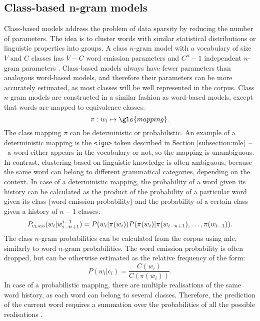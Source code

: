 	\subsection{Class-based n-gram models}
	\label{subsection:class}
	Class-based models address the problem of data sparsity by reducing the number of parameters. The idea is to cluster words with similar statistical distributions or linguistic properties into groups. A class \mbox{$n$-gram} model with a vocabulary of size $V$ and $C$ classes has $V-C$ word emission parameters and $C^{n}-1$ independent \mbox{$n$-gram} parameters \cite{brown1992class}. Class-based models always have fewer parameters than analogous word-based models, and therefore their parameters can be more accurately estimated, as most classes will be well represented in the corpus. Class \mbox{$n$-gram} models are constructed in a similar fashion as word-based models, except that words are mapped to equivalence classes: 
	\begin{equation}
		\pi:w_{i}\mapsto \gls{mapping}.
		\label{equation:deterministic_class}
	\end{equation}
	The class mapping $\pi$ can be deterministic or probabilistic. An example of a deterministic mapping is the \texttt{<ign>} token described in Section \ref{subsection:mle}~--~a word either appears in the vocabulary or not, so the mapping is unambiguous. In contrast, clustering based on linguistic knowledge is often ambiguous, because the same word can belong to different grammatical categories, depending on the context. 
	In case of a deterministic mapping, the probability of a word given its history can be calculated as the product of the probability of a particular word given its class (word emission probability) and the probability of a certain class given a history of $n-1$ classes:
	\begin{equation}
		P_{\textsc{class}}(w_{i}|w_{i-n+1}^{i-1})=P(w_{i}|\pi(w_{i}))P(\pi(w_{i})|\pi(w_{i-n+1}), \dots, \pi(w_{i-1})).
		\label{equation:classngram}
	\end{equation}
	The class \mbox{$n$-gram} probabilities can be calculated from the corpus using \gls{mle}, similarly to word \mbox{$n$-gram} probabilities. The word emission probability is often dropped, but can be otherwise estimated as the relative frequency of the form:
	\begin{equation}
		P(w_{i}|c_{i})=\frac{C(w_{i})}{C(\pi(w_{i}))}.
		\label{equation:emission_probability}
	\end{equation}
	In case of a probabilistic mapping, there are multiple realisations of the same word history, as each word can belong to several classes. Therefore, the prediction of the current word requires a summation over the probabilities of all the possible realisations \cite{ney1994structuring}.
